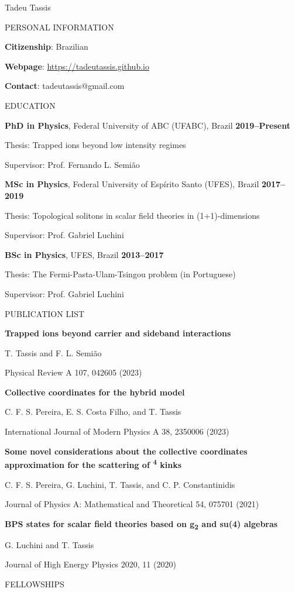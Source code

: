 \documentclass[11pt]{article}
\newcommand{\linesep}{\vspace*{1em}}
\newcommand{\MyTitle}[1]{
    {\fontfamily{cmbr} \fontsize{36}{48} \selectfont \color{Indigo} #1} \par
    \vspace*{1em}
}
\newcommand{\MySection}[1]{
    \vspace*{2em}
    {\fontfamily{cmbr} \large \color{Indigo} \uppercase{#1} \hrulefill} \par
    \vspace*{1em}
}
\newcommand{\InfoItem}[2]{
    \textbf{#1}: #2 \par
}
\newcommand{\EduItem}[6]{
    \textbf{#1}, #2, #3 \hfill \textbf{#4} \par
    {\small Thesis: #5 \par
    Supervisor: #6} \par
}
\newcommand{\PubItem}[3]{
    \textbf{#1} \par
    {\small #2 \par
    #3} \par
}
\begin{document}
\MyTitle{Tadeu Tassis}

\MySection{Personal information}

\InfoItem{Citizenship}{Brazilian}
\InfoItem{Webpage}{\url{https://tadeutassis.github.io}}
\InfoItem{Contact}{tadeutassis@gmail.com}

\MySection{Education}

\EduItem{PhD in Physics}
{Federal University of ABC (UFABC)}
{Brazil}
{2019--Present}
{Trapped ions beyond low intensity regimes}
{Prof. Fernando L. Semião}

\linesep

\EduItem{MSc in Physics}
{Federal University of Espírito Santo (UFES)}
{Brazil}
{2017--2019}
{Topological solitons in scalar field theories in (1+1)-dimensions}
{Prof. Gabriel Luchini}

\linesep

\EduItem{BSc in Physics}
{UFES}
{Brazil}
{2013--2017}
{The Fermi-Pasta-Ulam-Tsingou problem (in Portuguese)}
{Prof. Gabriel Luchini}

\MySection{Publication list}

\PubItem{Trapped ions beyond carrier and sideband interactions}
{T. Tassis and F. L. Semião}
{Physical Review A 107, 042605 (2023)}

\linesep

\PubItem{Collective coordinates for the hybrid model}
{C. F. S. Pereira, E. S. Costa Filho, and T. Tassis}
{International Journal of Modern Physics A 38, 2350006 (2023)}

\linesep

\PubItem{Some novel considerations about the collective coordinates approximation for the scattering of \textphi \textsuperscript{4} kinks}
{C. F. S. Pereira, G. Luchini, T. Tassis, and C. P. Constantinidis}
{Journal of Physics A: Mathematical and Theoretical 54, 075701 (2021)}

\linesep

\PubItem{BPS states for scalar field theories based on g\textsubscript{2} and su(4) algebras}
{G. Luchini and T. Tassis}
{Journal of High Energy Physics 2020, 11 (2020)}

\MySection{Fellowships}
\end{document}
